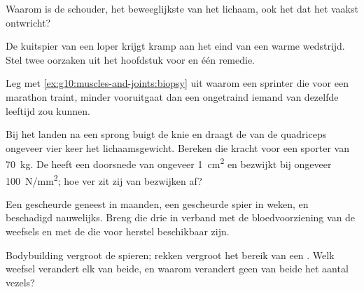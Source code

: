 \begin{exercise}[$\star\star$]\label{exo:g10:muscles-and-joints:9}
Waarom is de schouder, het beweeglijkste  van het lichaam, ook
het  dat het vaakst ontwricht?
\end{exercise}

\begin{exercise}[$\star\star$]\label{exo:g10:muscles-and-joints:10}
De kuitspier van een loper krijgt kramp aan het eind van een warme
wedstrijd. Stel twee oorzaken uit het hoofdstuk voor en één remedie.
\end{exercise}

\begin{exercise}[$\star\star$]\label{exo:g10:muscles-and-joints:11}
Leg met \cref{ex:g10:muscles-and-joints:biopsy} uit waarom een sprinter
die voor een marathon traint, minder vooruitgaat dan een ongetraind
iemand van dezelfde leeftijd zou kunnen.
\end{exercise}

\begin{exercise}[$\star\star\star$]\label{exo:g10:muscles-and-joints:12}
Bij het landen na een sprong buigt de knie en draagt de  van de
quadriceps ongeveer vier keer het lichaamsgewicht. Bereken die kracht
voor een sporter van \qty{70}{kg}. De  heeft een doorsnede van
ongeveer \qty{1}{cm^2} en bezwijkt bij ongeveer \qty{100}{N/mm^2}; hoe
ver zit zij van bezwijken af?
\end{exercise}

\begin{exercise}[$\star\star\star$]\label{exo:g10:muscles-and-joints:13}
Een gescheurde  geneest in maanden, een gescheurde spier in
weken, en beschadigd  nauwelijks. Breng die drie in verband met
de bloedvoorziening van de weefsels en met de  die voor herstel
beschikbaar zijn.
\end{exercise}

\begin{exercise}[$\star\star\star$]\label{exo:g10:muscles-and-joints:14}
Bodybuilding vergroot de spieren; rekken vergroot het bereik van een
. Welk weefsel verandert elk van beide, en waarom verandert geen
van beide het aantal vezels?
\end{exercise}

